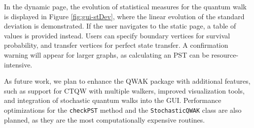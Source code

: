 \documentclass[main.tex]{subfiles}
\begin{document}
In the dynamic page, the evolution of statistical measures for the quantum walk
is displayed in Figure \ref{fig:gui-stDev}, where the linear evolution of the
standard deviation is demonstrated. If the user navigates to the static page, a
table of values is provided instead. Users can specify boundary vertices for
survival probability, and transfer vertices for perfect state transfer. A
confirmation warning will appear for larger graphs, as calculating an PST can
be resource-intensive.

As future work, we plan to enhance the QWAK package with additional features,
such as support for CTQW with multiple walkers, improved visualization tools,
and integration of stochastic quantum walks into the GUI. Performance
optimizations for the \texttt{checkPST} method and the \texttt{StochasticQWAK}
class are also planned, as they are the most computationally expensive routines.
\end{document}
